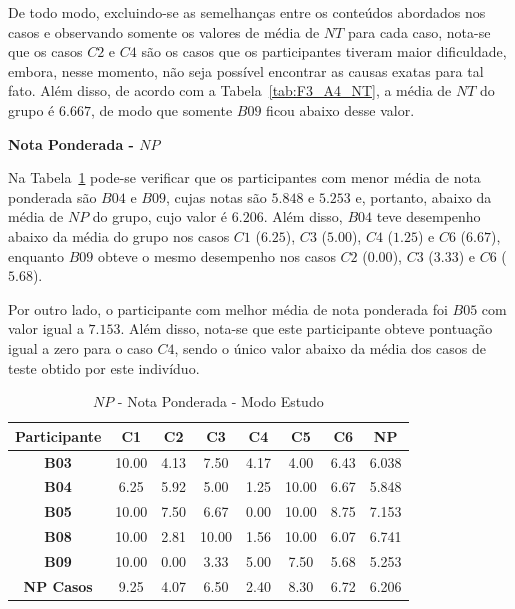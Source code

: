 De todo modo, excluindo-se as semelhanças entre os conteúdos abordados nos casos e observando somente os valores de média de $NT$ para cada caso, nota-se que os casos $C2$ e $C4$ são os casos que os participantes tiveram maior dificuldade, embora, nesse momento, não seja possível encontrar as causas exatas para tal fato. Além disso, de acordo com a Tabela~\ref{tab:F3_A4_NT}, a média de $NT$ do grupo é $6.667$, de modo que somente $B09$ ficou abaixo desse valor.

\textbf{Nota Ponderada - $NP$}

Na Tabela~\ref{tab:F3_A4_NP} pode-se verificar que os participantes com menor média de nota ponderada são $B04$ e $B09$, cujas notas são $5.848$ e $5.253$ e, portanto, abaixo da média de $NP$ do grupo, cujo valor é $6.206$. Além disso, $B04$ teve desempenho abaixo da média do grupo nos casos $C1$ ($6.25$), $C3$ ($5.00$), $C4$ ($1.25$) e $C6$ ($6.67$), enquanto $B09$ obteve o mesmo desempenho nos casos $C2$ ($0.00$), $C3$ ($3.33$) e $C6$ ($5.68$). 

Por outro lado, o participante com melhor média de nota ponderada foi $B05$ com valor igual a $7.153$. Além disso, nota-se que este participante obteve pontuação igual a zero para o caso $C4$, sendo o único valor abaixo da média dos casos de teste obtido por este indivíduo.

\begin{table}[htbp]
	\centering
	\caption{$NP$ - Nota Ponderada - Modo Estudo}
	\begin{tabular}{|c|c|c|c|c|c|c|c|}
		\hline
		\rowcolor[HTML]{D9D9D9} 
		\textbf{Participante} & \textbf{C1} & \textbf{C2} & \textbf{C3} & \textbf{C4} & \textbf{C5} & \textbf{C6} & \textbf{NP} \\ \hline
		\rowcolor[HTML]{FFFFFF} 
		\textbf{B03} & 10.00 & 4.13 & 7.50 & 4.17 & 4.00 & 6.43 & 6.038 \\ \hline
		\rowcolor[HTML]{E7E6E6} 
		\textbf{B04} & 6.25 & 5.92 & 5.00 & 1.25 & 10.00 & 6.67 & 5.848 \\ \hline
		\rowcolor[HTML]{FFFFFF} 
		\textbf{B05} & 10.00 & 7.50 & 6.67 & 0.00 & 10.00 & 8.75 & 7.153 \\ \hline
		\rowcolor[HTML]{E7E6E6} 
		\textbf{B08} & 10.00 & 2.81 & 10.00 & 1.56 & 10.00 & 6.07 & 6.741 \\ \hline
		\rowcolor[HTML]{FFFFFF} 
		\textbf{B09} & 10.00 & 0.00 & 3.33 & 5.00 & 7.50 & 5.68 & 5.253 \\ \hline
		\rowcolor[HTML]{D9D9D9} 
		\textbf{NP Casos} & 9.25 & 4.07 & 6.50 & 2.40 & 8.30 & 6.72 & 6.206 \\ \hline
	\end{tabular}
	\label{tab:F3_A4_NP}
\end{table}


